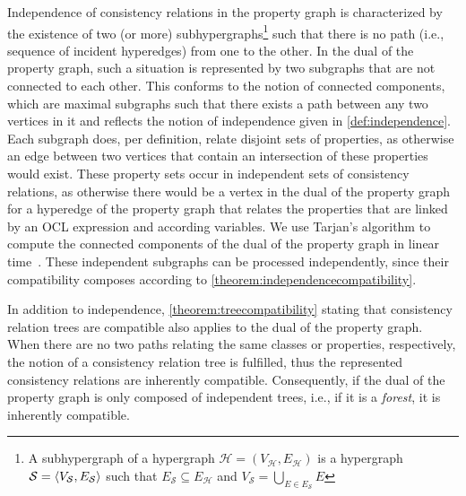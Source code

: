 Independence of consistency relations in the property graph is characterized by the existence of two (or more) subhypergraphs\footnote{A subhypergraph of a hypergraph $\mathcal{H} = (V_{\mathcal{H}}, E_{\mathcal{H}})$ is a hypergraph $\mathcal{S} = \langle V_{\mathcal{S}}, E_{\mathcal{S}} \rangle$ such that $E_{\mathcal{S}} \subseteq E_{\mathcal{H}}$ and $V_{\mathcal{S}} = \bigcup_{E \in E_{\mathcal{S}}} E$} such that there is no path (i.e., sequence of incident hyperedges) from one to the other.
In the dual of the property graph, such a situation is represented by two subgraphs that are not connected to each other.
This conforms to the notion of connected components, which are maximal subgraphs such that there exists a path between any two vertices in it and reflects the notion of independence given in \autoref{def:independence}.
Each subgraph does, per definition, relate disjoint sets of properties, as otherwise an edge between two vertices that contain an intersection of these properties would exist.
These property sets occur in independent sets of consistency relations, as otherwise there would be a vertex in the dual of the property graph for a hyperedge of the property graph that relates the properties that are linked by an \gls{OCL} expression and according \qvtr variables.
We use Tarjan's algorithm to compute the connected components of the dual of the property graph in linear time~\cite{tarjan1972depth}.
These independent subgraphs can be processed independently, since their compatibility composes according to \autoref{theorem:independencecompatibility}.

In addition to independence, \autoref{theorem:treecompatibility} stating that consistency relation trees are compatible also applies to the dual of the property graph.
When there are no two paths relating the same classes or properties, respectively, the notion of a consistency relation tree is fulfilled, thus the represented consistency relations are inherently compatible.
Consequently, if the dual of the property graph is only composed of independent trees, i.e., if it is a \emph{forest}, it is inherently compatible.

